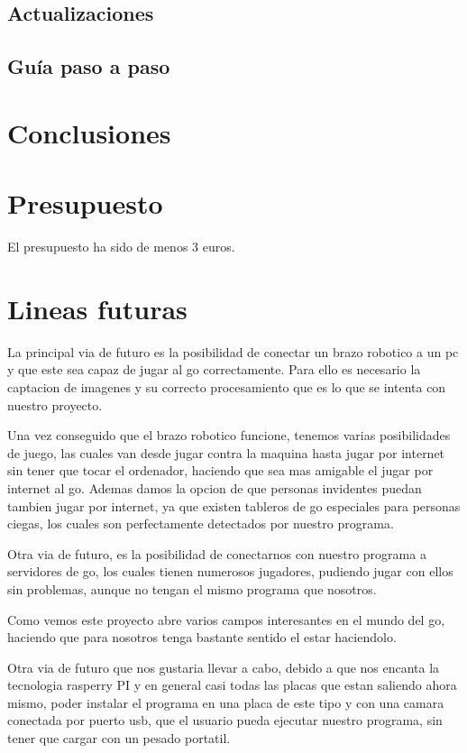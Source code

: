 \documentclass[12pt,a4paper]{report}
\begin{document}
\section{Actualizaciones}

\section{Guía paso a paso}

\chapter{Conclusiones}


\chapter{Presupuesto} El presupuesto ha sido de menos 3 euros.

\chapter{Lineas futuras}


La principal via de futuro es la posibilidad de conectar un brazo robotico a un
pc y que este sea capaz de jugar al go correctamente. Para ello es necesario la
captacion de imagenes y su correcto procesamiento que es lo que se intenta con
nuestro proyecto. 

Una vez conseguido que el brazo robotico funcione, tenemos varias posibilidades
de juego, las cuales van desde jugar contra la maquina hasta jugar por internet
sin tener que tocar el ordenador, haciendo que sea mas amigable el jugar por
internet al go. Ademas damos la opcion de que personas invidentes puedan tambien
jugar por internet, ya que existen tableros de go especiales para personas
ciegas, los cuales son perfectamente detectados por nuestro programa.

Otra via de futuro, es la posibilidad de conectarnos con nuestro programa a
servidores de go, los cuales tienen numerosos jugadores, pudiendo jugar con
ellos sin problemas, aunque no tengan el mismo programa que nosotros.

Como vemos este proyecto abre varios campos interesantes en el mundo del go,
haciendo que para nosotros tenga bastante sentido el estar haciendolo. 

Otra via de futuro que nos gustaria llevar a cabo, debido a que nos encanta la
tecnologia rasperry PI y en general casi todas las placas que estan saliendo
ahora mismo, poder instalar el programa en una placa de este tipo y con una
camara conectada por puerto usb, que el usuario pueda ejecutar nuestro programa,
sin tener que cargar con un pesado portatil. 
\end{document}
